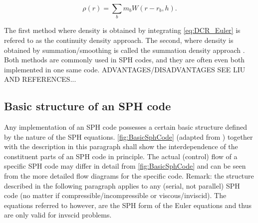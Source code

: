 \documentclass{report}
\begin{document}
\begin{equation}
\label{eq:SumDensity}
\rho(r)=\sum_b m_b W(r-r_b,h).
\end{equation}

The first method where density is obtained by integrating \ref{eq:DCR_Euler} is refered 
to as the continuity density approach. The second, where density is obtained by 
summation/smoothing is called the summation density approach \cite{Liu2003}. 
Both methods are commonly used in SPH codes, and they are often even both implemented 
in one same code. ADVANTAGES/DISADVANTAGES SEE LIU AND REFERENCES...

\subsection{Basic structure of an SPH code}

Any implementation of an SPH code possesses a certain basic structure defined by the 
nature of the SPH equations. \ref{fig:BasicSphCode} (adapted from \cite{Liu2003}) 
together with the description in this paragraph shall show the interdependence of the 
constituent parts of an SPH code in principle. The actual (control) flow of a specific
SPH code may differ in detail from \ref{fig:BasicSphCode} and can be seen 
from the more detailed flow diagrams for the specific code.
Remark: the structure described in the following paragraph applies to any (serial, not parallel) SPH code (no matter if compressible/incompressible or viscous/inviscid). The equations referred to however, are the SPH form of the Euler equations and thus are only valid for invscid problems.
\end{document}
